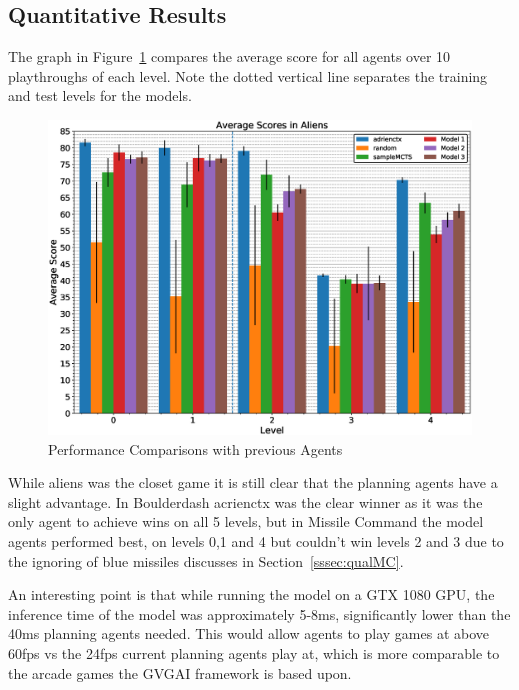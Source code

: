 \subsection{Quantitative Results}
The graph in Figure~\ref{fig:aliensScore} compares the average score for all agents over 10 playthroughs of each level.
Note the dotted vertical line separates the training and test levels for the models.
\begin{figure}[ht]
  \centering
  \includegraphics[width=0.7\linewidth]{graphs/FinalAliensScores.eps}
  \caption{Performance Comparisons with previous Agents}
  \label{fig:aliensScore}
\end{figure}
\par
While aliens was the closet game it is still clear that the planning agents have a slight advantage.
In Boulderdash acrienctx was the clear winner as it was the only agent to achieve wins on all 5 levels, but in Missile Command the model agents performed best, on levels 0,1 and 4 but couldn't win levels 2 and 3 due to the ignoring of blue missiles discusses in Section~\ref{sssec:qualMC}.
\par
An interesting point is that while running the model on a GTX 1080 GPU, the inference time of the model was approximately 5-8ms, significantly lower than the 40ms planning agents needed.
This would allow agents to play games at above 60fps vs the 24fps current planning agents play at, which is more comparable to the arcade games the GVGAI framework is based upon.
